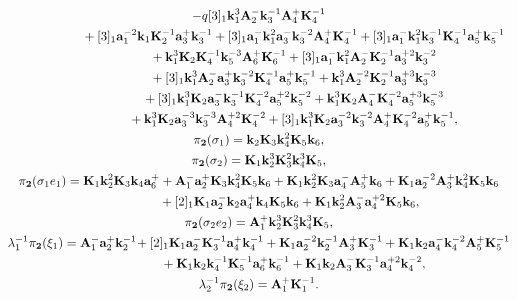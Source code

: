 \documentclass[11pt]{article}
\def\bk{{\bf k}}
\def\bK{{\bf K}}
\begin{document}
\begin{gather*}
 - q [3]_1 \bk^{3}_1 {\bf A}^-_2 \bk^{-1}_3 {\bf A}^+_4 \bK^{-1}_4\\
\hphantom{\lambda_2^{-1}\pi_{\bf 1}(\xi_2)=}{}
 + [3]_1 {\bf a}_1^{-2} \bk_1 \bK^{-1}_2 {\bf a}^+_3 \bk^{-1}_3
 + [3]_1 {\bf a}^-_1 \bk^{2}_1 {\bf a}^-_3 \bk^{-2}_3 {\bf A}^+_4 \bK^{-1}_4
 + [3]_1 {\bf a}^-_1 \bk^{2}_1 \bk^{-1}_3 \bK^{-1}_4 {\bf a}^+_5 \bk^{-1}_5\\
\hphantom{\lambda_2^{-1}\pi_{\bf 1}(\xi_2)=}{}
 + \bk^{3}_1 \bK_2 \bK^{-1}_4 \bk^{-3}_5 {\bf A}^+_6 \bK^{-1}_6
 + [3]_1 {\bf a}^-_1 \bk^{2}_1 {\bf A}^-_2 \bK^{-1}_2 {\bf a}_3^{+2} \bk^{-2}_3
\\
\hphantom{\lambda_2^{-1}\pi_{\bf 1}(\xi_2)=}{}
 + [3]_1 \bk^{3}_1 {\bf A}^-_2 {\bf a}^+_3 \bk^{-2}_3 \bK^{-1}_4 {\bf a}^+_5 \bk^{-1}_5
 + \bk^{3}_1 {\bf A}_2^{-2} \bK^{-1}_2 {\bf a}_3^{+3} \bk^{-3}_3
\\
\hphantom{\lambda_2^{-1}\pi_{\bf 1}(\xi_2)=}{}
 + [3]_1 \bk^{3}_1 \bK_2 {\bf a}^-_3 \bk^{-1}_3 \bK^{-2}_4 {\bf a}_5^{+2} \bk^{-2}_5
 + \bk^{3}_1 \bK_2  {\bf A}^-_4 \bK^{-2}_4 {\bf a}_5^{+3} \bk^{-3}_5\\
\hphantom{\lambda_2^{-1}\pi_{\bf 1}(\xi_2)=}{}
 + \bk^{3}_1 \bK_2 {\bf a}_3^{-3} \bk^{-3}_3 {\bf A}_4^{+2} \bK^{-2}_4
 + [3]_1 \bk^{3}_1 \bK_2 {\bf a}_3^{-2} \bk^{-2}_3 {\bf A}^+_4 \bK^{-2}_4 {\bf a}^+_5
\bk^{-1}_5,\\
\pi_{\bf 2}(\sigma_1)=\bk_2 \bK_3 \bk^{2}_4 \bK_5 \bk_6,\\
\pi_{\bf 2}(\sigma_2)=\bK_1 \bk^{3}_2 \bK^{2}_3 \bk^{3}_4 \bK_5,\\
\pi_{\bf 2}(\sigma_1e_1)=\bK_1 \bk^{2}_2 \bK_3 \bk_4 {\bf a}^+_6
 + {\bf A}^-_1 {\bf a}^+_2 \bK_3 \bk^{2}_4 \bK_5 \bk_6
 + \bK_1 \bk^{2}_2 \bK_3 {\bf a}^-_4 {\bf A}^+_5 \bk_6
 + \bK_1 {\bf a}_2^{-2} {\bf A}^+_3 \bk^{2}_4 \bK_5 \bk_6\\
\hphantom{\pi_{\bf 2}(\sigma_1e_1)=}{}
 + [2]_1 \bK_1 {\bf a}^-_2 \bk_2 {\bf a}^+_4 \bk_4 \bK_5 \bk_6
 + \bK_1 \bk^{2}_2 {\bf A}^-_3 {\bf a}_4^{+2} \bK_5 \bk_6,\\
\pi_{\bf 2}(\sigma_2e_2)={\bf A}^+_1 \bk^{3}_2 \bK^{2}_3 \bk^{3}_4 \bK_5,\\
\lambda_1^{-1}\pi_{\bf 2}(\xi_1)={\bf A}^-_1 {\bf a}^+_2 \bk^{-1}_2\!
 + [2]_1 \bK_1 {\bf a}^-_2 \bK^{-1}_3 {\bf a}^+_4 \bk^{-1}_4
 + \bK_1 {\bf a}_2^{-2} \bk^{-1}_2 {\bf A}^+_3 \bK^{-1}_3
 + \bK_1 \bk_2 {\bf a}^-_4 \bk^{-2}_4 {\bf A}^+_5 \bK^{-1}_5\\
\hphantom{\lambda_1^{-1}\pi_{\bf 2}(\xi_1)=}{}
 + \bK_1 \bk_2 \bk^{-1}_4 \bK^{-1}_5 {\bf a}^+_6 \bk^{-1}_6
 + \bK_1 \bk_2 {\bf A}^-_3 \bK^{-1}_3 {\bf a}_4^{+2} \bk^{-2}_4,\\
\lambda_2^{-1}\pi_{\bf 2}(\xi_2)={\bf A}^+_1 \bK^{-1}_1.
\end{gather*}
\end{document}
